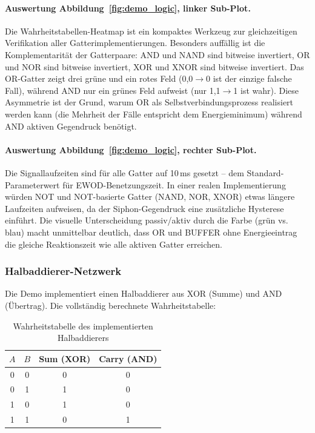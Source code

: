 ﻿\documentclass[a4paper,12pt]{scrreprt}
\theoremstyle{definition}
\begin{document}
\paragraph{Auswertung Abbildung~\ref{fig:demo_logic}, linker Sub-Plot.}
Die Wahrheitstabellen-Heatmap ist ein kompaktes Werkzeug zur gleichzeitigen
Verifikation aller Gatterimplementierungen. Besonders auffällig ist die
Komplementarität der Gatterpaare: AND und NAND sind bitweise invertiert,
OR und NOR sind bitweise invertiert, XOR und XNOR sind bitweise invertiert.
Das OR-Gatter zeigt drei grüne und ein rotes Feld (0,0$\to$0 ist der einzige
falsche Fall), während AND nur ein grünes Feld aufweist (nur 1,1$\to$1 ist wahr).
Diese Asymmetrie ist der Grund, warum OR als Selbstverbindungsprozess realisiert
werden kann (die Mehrheit der Fälle entspricht dem Energieminimum) während AND
aktiven Gegendruck benötigt.

\paragraph{Auswertung Abbildung~\ref{fig:demo_logic}, rechter Sub-Plot.}
Die Signallaufzeiten sind für alle Gatter auf 10\,ms gesetzt -- dem Standard-Parameterwert
für EWOD-Benetzungszeit. In einer realen Implementierung würden NOT und NOT-basierte
Gatter (NAND, NOR, XNOR) etwas längere Laufzeiten aufweisen, da der Siphon-Gegendruck
eine zusätzliche Hysterese einführt. Die visuelle Unterscheidung passiv/aktiv
durch die Farbe (grün vs. blau) macht unmittelbar deutlich, dass OR und BUFFER
ohne Energieeintrag die gleiche Reaktionszeit wie alle aktiven Gatter erreichen.

\subsubsection{Halbaddierer-Netzwerk}

Die Demo implementiert einen Halbaddierer aus XOR (Summe) und AND (Übertrag).
Die vollständig berechnete Wahrheitstabelle:

\begin{table}[H]
	\centering
	\caption{Wahrheitstabelle des implementierten Halbaddierers}
	\label{tab:halbaddierer}
	\begin{tabular}{cccc}
		\toprule
		$A$ & $B$ & Sum (XOR) & Carry (AND) \\
		\midrule
		0 & 0 & 0 & 0 \\
		0 & 1 & 1 & 0 \\
		1 & 0 & 1 & 0 \\
		1 & 1 & 0 & 1 \\
		\bottomrule
	\end{tabular}
\end{table}
\end{document}
